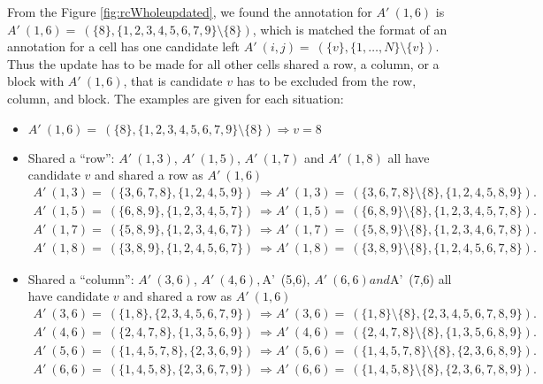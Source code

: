 \documentclass[11pt]{report}
\newcommand{\set}[1]{\{ #1 \}}
\begin{document}
From the Figure \ref{fig:rcWholeupdated}, we found the annotation for $A'\ (1,6)$ is $A'\ (1,6) =\ (\set{8}, \set{1, 2, 3, 4, 5, 6, 7, 9} \setminus \set{8})$, which is matched the format of an annotation for a cell has one candidate left $A'\ (i,j) =\ (\set{v}, \set{1,\dots,N} \setminus \set{v})$. Thus the update has to be made for all other cells shared a row, a column, or a block with $A'\ (1,6)$, that is candidate $v$ has to be excluded from the row, column, and block. The examples are given for each situation:
\begin{itemize}
\item $A'\ (1,6) =\ (\set{8}, \set{1, 2, 3, 4, 5, 6, 7, 9} \setminus \set{8}) \Rightarrow v = 8$
\item Shared a ``row'': $A'\ (1,3)$, $A'\ (1,5)$, $A'\ (1,7)$ and $A'\ (1,8)$ all have candidate $v$ and shared a row as $A'\ (1,6)$
\begin{eqnarray*}
A'\ (1,3) =\ (\set{3, 6, 7, 8}, \set{1, 2, 4, 5, 9})\ \Rightarrow A'\ (1,3) =\ (\set{3, 6, 7, 8}\setminus \set{8}, \set{1, 2, 4, 5, 8, 9}).\\
A'\ (1,5) =\ (\set{6, 8, 9}, \set{1, 2, 3, 4, 5, 7})\ \Rightarrow A'\ (1,5) =\ (\set{6, 8, 9}\setminus \set{8}, \set{1, 2, 3, 4, 5, 7, 8}).\\
A'\ (1,7) =\ (\set{5, 8, 9}, \set{1, 2, 3, 4, 6, 7})\ \Rightarrow A'\ (1,7) =\ (\set{5, 8, 9}\setminus \set{8}, \set{1, 2, 3, 4, 6, 7, 8}).\\
A'\ (1,8) =\ (\set{3, 8, 9}, \set{1, 2, 4, 5, 6, 7})\ \Rightarrow A'\ (1,8) =\ (\set{3, 8, 9}\setminus \set{8}, \set{1, 2, 4, 5, 6, 7, 8}).
\end{eqnarray*}
\item Shared a ``column'': $A'\ (3,6)$, $A'\ (4,6), $A'\ (5,6), $A'\ (6,6) and $A'\ (7,6) all have candidate $v$ and shared a row as $A'\ (1,6)$
\begin{eqnarray*}
A'\ (3,6) =\ (\set{1, 8}, \set{2, 3, 4, 5, 6, 7, 9})\ \Rightarrow A'\ (3,6) =\ (\set{1, 8}\setminus \set{8}, \set{2, 3, 4, 5, 6, 7, 8, 9}).\\
A'\ (4,6) =\ (\set{2, 4, 7, 8}, \set{1, 3, 5, 6, 9})\ \Rightarrow A'\ (4,6) =\ (\set{2, 4, 7, 8}\setminus \set{8}, \set{1, 3, 5, 6, 8, 9}).\\
A'\ (5,6) =\ (\set{1, 4, 5, 7, 8}, \set{2, 3, 6, 9})\ \Rightarrow A'\ (5,6) =\ (\set{1, 4, 5, 7, 8}\setminus \set{8}, \set{2, 3, 6, 8, 9}).\\
A'\ (6,6) =\ (\set{1, 4, 5, 8}, \set{2, 3, 6, 7, 9})\ \Rightarrow A'\ (6,6) =\ (\set{1, 4, 5, 8}\setminus \set{8}, \set{2, 3, 6, 7, 8, 9}).\\

\end{eqnarray*}
\end{itemize}
\end{document}
